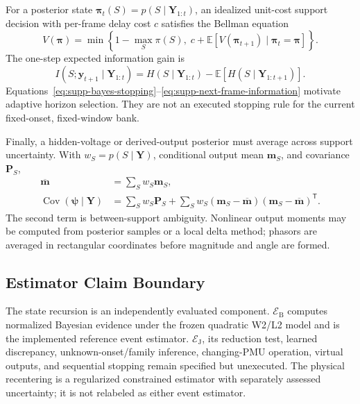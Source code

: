 For a posterior state $\bm\pi_t(S)=p(S\mid\bm Y_{1:t})$, an idealized unit-cost support decision with per-frame delay cost $c$ satisfies the Bellman equation
\begin{equation}
 V(\bm\pi)=\min\left\{
 1-\max_S\pi(S),\;
 c+\mathbb E[V(\bm\pi_{t+1})\mid\bm\pi_t=\bm\pi]
 \right\}.
 \label{eq:supp-bayes-stopping}
\end{equation}
The one-step expected information gain is
\begin{equation}
 I(S;\bm y_{t+1}\mid\bm Y_{1:t})
 =H(S\mid\bm Y_{1:t})
 -\mathbb E[H(S\mid\bm Y_{1:t+1})].
 \label{eq:supp-next-frame-information}
\end{equation}
Equations~\eqref{eq:supp-bayes-stopping}--\eqref{eq:supp-next-frame-information} motivate adaptive horizon selection. They are not an executed stopping rule for the current fixed-onset, fixed-window bank.

Finally, a hidden-voltage or derived-output posterior must average across support
uncertainty. With $w_S=p(S\mid\bm Y)$, conditional output mean $\bm m_S$, and
covariance $\bm P_S$,
\begin{align}
 \overline{\bm m}&=\sum_Sw_S\bm m_S,\label{eq:supp-mixture-mean}\\
 \operatorname{Cov}(\bm\psi\mid\bm Y)
 &=\sum_Sw_S\bm P_S
 +\sum_Sw_S(\bm m_S-\overline{\bm m})
 (\bm m_S-\overline{\bm m})^{\mathsf T}.
 \label{eq:supp-total-mixture-covariance}
\end{align}
The second term is between-support ambiguity. Nonlinear output moments may be
computed from posterior samples or a local delta method; phasors are averaged in
rectangular coordinates before magnitude and angle are formed.

\subsection{Estimator Claim Boundary}

The state recursion is an independently evaluated component. $\mathcal E_{\mathrm B}$
computes normalized Bayesian evidence under the frozen quadratic W2/L2 model and
is the implemented reference event estimator. $\mathcal E_{\mathrm J}$, its
reduction test, learned discrepancy, unknown-onset/family inference,
changing-PMU operation, virtual outputs, and sequential stopping remain
specified but unexecuted. The physical recentering is a regularized constrained
estimator with separately assessed uncertainty; it is not relabeled as either
event estimator.
